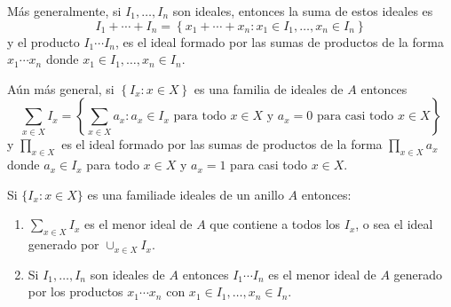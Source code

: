 Más generalmente, si $I_1,\dots,I_n$ son ideales, entonces la suma de estos ideales es
$$I_1+\cdots +I_n=\left\lbrace x_1+\cdots+x_n: x_1\in I_1,\dots, x_n\in I_n\right\rbrace$$
y el producto $I_1\cdots I_n$, es el ideal formado por las sumas de productos de la forma $x_1\cdots x_n$ donde $x_1\in I_1,\dots,x_n\in I_n$.

Aún más general, si $\left\lbrace I_x : x\in X\right\rbrace$ es una familia de ideales de $A$ entonces
$$\sum_{x\in X}I_x=\left\lbrace \sum_{x\in X}a_x : a_x \in I_x\text{ para todo }x\in X\text{ y }a_x=0\text{ para casi todo }x\in X\right\rbrace$$
y $\prod_{x\in X}$ es el ideal formado por las sumas de productos de la forma $\prod_{x\in X}a_x$ donde $a_x\in I_x$ para todo $x\in X$ y $a_x=1$ para casi todo $x\in X$.

\begin{prop}
    Si $\{I_x: x\in X\}$ es una familiade ideales de un anillo $A$ entonces:
    \begin{enumerate}[label=(\arabic*)]
        \item $\sum_{x\in X}I_x$ es el menor ideal de $A$ que contiene a todos los $I_x$, o sea el ideal generado por $\cup_{x\in X}I_x$.
        \item Si $I_1,\dots,I_n$ son ideales de $A$ entonces $I_1\cdots I_n$ es el menor ideal de $A$ generado por los productos $x_1\cdots x_n$ con $x_1\in I_1,\dots, x_n\in I_n$.
    \end{enumerate}
\end{prop}